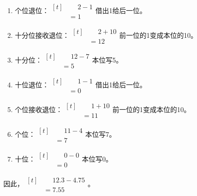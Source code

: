 {\begin{enumerate}[leftmargin=1.7em,itemsep=5pt,topsep=0pt]
\item 个位退位：\(\begin{aligned}[t]&\phantom{={}}2-1\\&=1\end{aligned}\)\quad 借出1给后一位。
\item 十分位接收退位：\(\begin{aligned}[t]&\phantom{={}}2+10\\&=12\end{aligned}\)\quad 前一位的1变成本位的10。
\item 十分位：\(\begin{aligned}[t]&\phantom{={}}12-7\\&=5\end{aligned}\)\quad 本位写5。
\item 十位退位：\(\begin{aligned}[t]&\phantom{={}}1-1\\&=0\end{aligned}\)\quad 借出1给后一位。
\item 个位接收退位：\(\begin{aligned}[t]&\phantom{={}}1+10\\&=11\end{aligned}\)\quad 前一位的1变成本位的10。
\item 个位：\(\begin{aligned}[t]&\phantom{={}}11-4\\&=7\end{aligned}\)\quad 本位写7。
\item 十位：\(\begin{aligned}[t]&\phantom{={}}0-0\\&=0\end{aligned}\)\quad 本位写0。
\end{enumerate}
\par\smallskip
因此，\(\begin{aligned}[t]&\phantom{={}}12.3-4.75\\&=7.55\end{aligned}\)。
\par\medskip

}
